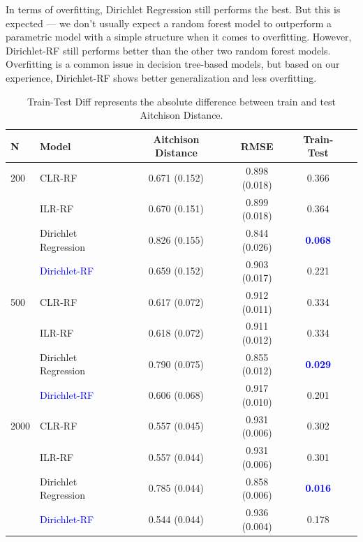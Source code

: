 \begin{frame}
{{In terms of overfitting, Dirichlet Regression still performs the best. But this is expected — we don’t usually expect a random forest model to outperform a parametric model with a simple structure when it comes to overfitting.
However, Dirichlet-RF still performs better than the other two random forest models. Overfitting is a common issue in decision tree-based models, but based on our experience, Dirichlet-RF shows better generalization and less overfitting.
}
\begin{table}[htbp]
\centering
\small 
\begin{tabular}{|l|l|c|c|c|c|}
\hline
N & Model & Aitchison Distance & RMSE & Train-Test \\

\hline
{200} 
    & CLR-RF & 0.671 (0.152) & 0.898 (0.018) & 0.366 \\
    & ILR-RF & 0.670 (0.151) & 0.899 (0.018) & 0.364 \\
    & Dirichlet Regression & 0.826 (0.155) & 0.844 (0.026)  & \textcolor{blue}{\textbf{0.068}} \\
    & \textcolor{blue}{{Dirichlet-RF}} & 0.659 (0.152) & 0.903 (0.017)  & 0.221 \\
\hline
{500} 
    & CLR-RF & 0.617 (0.072) & 0.912 (0.011) &   0.334 \\
    & ILR-RF & 0.618 (0.072) & 0.911 (0.012) &  0.334 \\
    & Dirichlet Regression & 0.790 (0.075) & 0.855 (0.012)  & \textcolor{blue}{\textbf{0.029}} \\
    & \textcolor{blue}{{Dirichlet-RF}} & 0.606 (0.068) & 0.917 (0.010)  & 0.201 \\
\hline
{2000} 
    & CLR-RF & 0.557 (0.045) & 0.931 (0.006) & 0.302 \\
    & ILR-RF & 0.557 (0.044) & 0.931 (0.006)& 0.301 \\
    & Dirichlet Regression & 0.785 (0.044) & 0.858 (0.006)  & \textcolor{blue}{\textbf{0.016} }\\
    &\textcolor{blue}{ {Dirichlet-RF}} & 0.544 (0.044) & 0.936 (0.004) & 0.178 \\
\hline
\end{tabular}
\caption{ Train-Test Diff represents the absolute difference between train and test Aitchison Distance.}
\label{tab:performance-comparison}
\end{table}
}

\end{frame}
